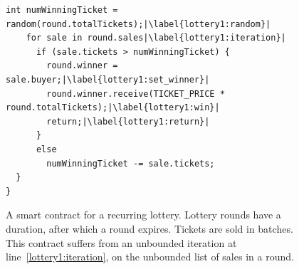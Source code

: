 \begin{figure}
\begin{lstlisting}[language=pseudo]
    int numWinningTicket = random(round.totalTickets);|\label{lottery1:random}|
    for sale in round.sales|\label{lottery1:iteration}|
      if (sale.tickets > numWinningTicket) {
        round.winner = sale.buyer;|\label{lottery1:set_winner}|
        round.winner.receive(TICKET_PRICE * round.totalTickets);|\label{lottery1:win}|
        return;|\label{lottery1:return}|
      }
      else
        numWinningTicket -= sale.tickets;
  }
}
  \end{lstlisting}
  \caption{A smart contract for a recurring lottery. Lottery rounds have a duration,
    after which a round expires. Tickets are sold in batches. This contract
    suffers from an unbounded iteration at line~\ref{lottery1:iteration}, on the unbounded
    list of sales in a round.}
  \label{fig:lottery1}
\end{figure}

